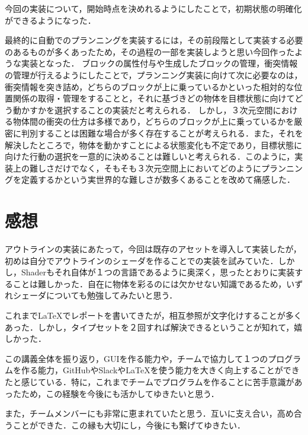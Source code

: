 \documentclass[12pt]{jarticle}
\begin{document}
今回の実装について，開始時点を決めれるようにしたことで，初期状態の明確化ができるようになった．

最終的に自動でのプランニングを実装するには，その前段階として実装する必要のあるものが多くあったため，その過程の一部を実装しようと思い今回作ったような実装となった．
ブロックの属性付与や生成したブロックの管理，衝突情報の管理が行えるようにしたことで，プランニング実装に向けて次に必要なのは，衝突情報を突き詰め，どちらのブロックが上に乗っているかといった相対的な位置関係の取得・管理をすることと，それに基づきどの物体を目標状態に向けてどう動かすかを選択することの実装だと考えられる．
しかし，３次元空間における物体間の衝突の仕方は多様であり，どちらのブロックが上に乗っているかを厳密に判別することは困難な場合が多く存在することが考えられる．また，それを解決したところで，物体を動かすことによる状態変化も不定であり，目標状態に向けた行動の選択を一意的に決めることは難しいと考えられる．このように，実装上の難しさだけでなく，そもそも３次元空間上においてどのようにプランニングを定義するかという実世界的な難しさが数多くあることを改めて痛感した．

\section{感想}
アウトラインの実装にあたって，今回は既存のアセットを導入して実装したが，初めは自分でアウトラインのシェーダを作ることでの実装を試みていた．しかし，Shaderもそれ自体が１つの言語であるように奥深く，思ったとおりに実装することは難しかった．自在に物体を彩るのには欠かせない知識であるため，いずれシェーダについても勉強してみたいと思う．

これまでLaTeXでレポートを書いてきたが，相互参照が文字化けすることが多くあった．しかし，タイプセットを２回すれば解決できる\cite{latex}ということが知れて，嬉しかった．

この講義全体を振り返り，GUIを作る能力や，チームで協力して１つのプログラムを作る能力，GitHubやSlackやLaTeXを使う能力を大きく向上することができたと感じている．特に，これまでチームでプログラムを作ることに苦手意識があったため，この経験を今後にも活かしてゆきたいと思う．

また，チームメンバーにも非常に恵まれていたと思う．互いに支え合い，高め合うことができた．この縁も大切にし，今後にも繋げてゆきたい．
\end{document}
